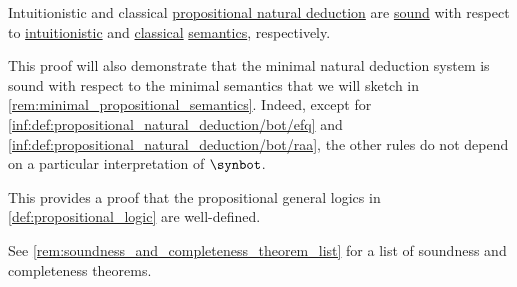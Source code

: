 \begin{theorem}\label{thm:propositional_natural_deduction_soundness}
  Intuitionistic and classical \hyperref[def:propositional_natural_deduction]{propositional natural deduction} are \hyperref[def:general_logic]{sound} with respect to \hyperref[def:truth_value_algebra/intuitionistic]{intuitionistic} and \hyperref[def:truth_value_algebra/classical]{classical} \hyperref[def:propositional_semantics]{semantics}, respectively.
\end{theorem}
\begin{comments}
  \item This proof will also demonstrate that the minimal natural deduction system is sound with respect to the minimal semantics that we will sketch in \cref{rem:minimal_propositional_semantics}. Indeed, except for \ref{inf:def:propositional_natural_deduction/bot/efq} and \ref{inf:def:propositional_natural_deduction/bot/raa}, the other rules do not depend on a particular interpretation of \( \synbot \).

  \item This provides a proof that the propositional general logics in \cref{def:propositional_logic} are well-defined.

  \item See \cref{rem:soundness_and_completeness_theorem_list} for a list of soundness and completeness theorems.
\end{comments}
